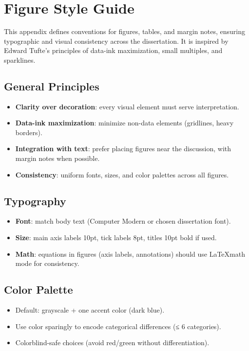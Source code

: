 \chapter{Figure Style Guide}

\newcommand{\marginfig}[2]{%
  \marginnote{\centering\texttt{[image: \#1]}\par\footnotesize #2}%
}

This appendix defines conventions for figures, tables, and margin notes, ensuring typographic and visual consistency across the dissertation. 
It is inspired by Edward Tufte’s principles of data-ink maximization, small multiples, and sparklines.

\section{General Principles}
\begin{itemize}
  \item \textbf{Clarity over decoration}: every visual element must serve interpretation.
  \item \textbf{Data-ink maximization}: minimize non-data elements (gridlines, heavy borders).
  \item \textbf{Integration with text}: prefer placing figures near the discussion, with margin notes when possible.
  \item \textbf{Consistency}: uniform fonts, sizes, and color palettes across all figures.
\end{itemize}

\section{Typography}
\begin{itemize}
  \item \textbf{Font}: match body text (Computer Modern or chosen dissertation font).
  \item \textbf{Size}: main axis labels 10pt, tick labels 8pt, titles 10pt bold if used.
  \item \textbf{Math}: equations in figures (axis labels, annotations) should use \LaTeX math mode for consistency.
\end{itemize}

\section{Color Palette}
\begin{itemize}
  \item Default: grayscale + one accent color (dark blue).
  \item Use color sparingly to encode categorical differences (≤ 6 categories).
  \item Colorblind-safe choices (avoid red/green without differentiation).
\end{itemize}

